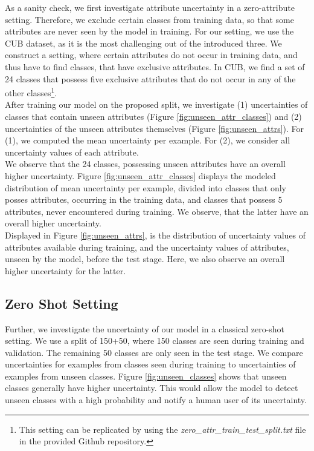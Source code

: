\documentclass[a4paper,cleardoubleempty,BCOR1cm, 11pt]{report}
\begin{document}
As a sanity check, we first investigate attribute uncertainty in a zero-attribute setting. Therefore, we exclude certain classes from training data, so that some attributes are never seen by the model in training. For our setting, we use the CUB dataset, as it is the most challenging out of the introduced three. We construct a setting, where certain attributes do not occur in training data, and thus have to find classes, that have exclusive attributes. In CUB, we find a set of 24 classes that possess five exclusive attributes that do not occur in any of the other classes\footnote{This setting can be replicated by using the \textit{zero\_attr\_train\_test\_split.txt} file in the provided Github repository.}.\\
After training our model on the proposed split, we investigate (1) uncertainties of classes that contain unseen attributes (Figure \ref{fig:unseen_attr_classes}) and (2) uncertainties of the unseen attributes themselves (Figure \ref{fig:unseen_attrs}). For (1), we computed the mean uncertainty per example. For (2), we consider all uncertainty values of each attribute.\\
We observe that the 24 classes, possessing unseen attributes have an overall higher uncertainty. Figure \ref{fig:unseen_attr_classes} displays the modeled distribution of mean uncertainty per example, divided into classes that only posses attributes, occurring in the training data, and classes that possess 5 attributes, never encountered during training. We observe, that the latter have an overall higher uncertainty.\\
Displayed in Figure \ref{fig:unseen_attrs}, is the distribution of uncertainty values of attributes available during training, and the uncertainty values of attributes, unseen by the model, before the test stage. Here, we also observe an overall higher uncertainty for the latter.

\subsection{Zero Shot Setting}
Further, we investigate the uncertainty of our model in a classical zero-shot setting. We use a split of 150+50, where 150 classes are seen during training and validation. The remaining 50 classes are only seen in the test stage. We compare uncertainties for examples from classes seen during training to uncertainties of examples from unseen classes. Figure \ref{fig:unseen_classes} shows that unseen classes generally have higher uncertainty. This would allow the model to detect unseen classes with a high probability and notify a human user of its uncertainty.
\end{document}
